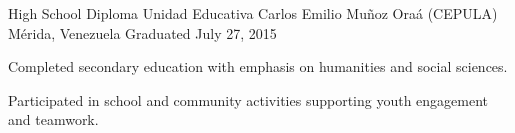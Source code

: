 \begin{cventries}

  \cventry
    {High School Diploma}
    {Unidad Educativa Carlos Emilio Muñoz Oraá (CEPULA)}
    {Mérida, Venezuela}
    {Graduated July 27, 2015}
    {
      \begin{cvitems}
        \item {Completed secondary education with emphasis on humanities and social sciences.}
        \item {Participated in school and community activities supporting youth engagement and teamwork.}
      \end{cvitems}
    }

\end{cventries}
